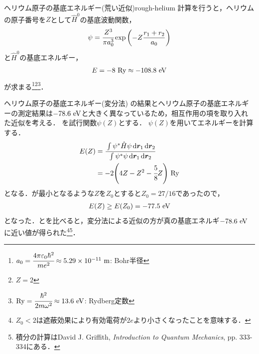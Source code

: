 \documentclass{report}
\begin{document}
  \begin{myex}{ヘリウム原子の基底エネルギー(荒い近似)}{rough-helium}
    計算を行うと，ヘリウムの原子番号を$Z$として$\hat{H}^0$の基底波動関数，
    \begin{align}
      \psi = \cfrac{Z^3}{\pi a_0^3}\exp\qty(-Z\frac{r_1 + r_2}{a_0})\label{helium}
    \end{align}
    と$\hat{H}^0$の基底エネルギー，
    \begin{align}
      E = -8\ \mathrm{Ry}\approx -108.8\ \mathrm{eV}\label{helium-rough-min}
    \end{align}
    が求まる\footnote{
      $a_0 = \cfrac{4\pi\epsilon_0\hbar^2}{me^2} \approx 5.29\times 10^{-11}\ \r{m}$: Bohr半径
    }\footnote{
      $Z = 2$
    }\footnote{
      $\mathrm{Ry} = \cfrac{\hbar^2}{2m\omega^2} \approx 13.6 \ \mathrm{eV}$: Rydberg定数
    }．
  \end{myex}
  \begin{myex}{ヘリウム原子の基底エネルギー(変分法)}{}
    の結果とヘリウム原子の基底エネルギーの測定結果は$-78.6\ \r{eV}$と大きく異なっているため，相互作用の項を取り入れた近似を考える．
    を試行関数$\psi(Z)$とする．
    $\psi(Z)$を用いてエネルギーを計算する．
    \begin{align}
      E(Z) &= \cfrac{\int\psi^{*}\hat{H}\psi \dd{\bm{r}_1}\dd{\bm{r}_2}}{\int\psi^{*}\psi \dd{\bm{r}_1}\dd{\bm{r}_2}} \\
      &= -2\qty(4Z - Z^2 - \cfrac{5}{8}Z)\ \r{Ry}\label{helium-energy-function} 
    \end{align}
    となる．が最小となるような$Z$を$Z_0$とすると$Z_0 = 27/16$であったので，
    \begin{align}
      E(Z) \geq E\qty(Z_0) = -77.5\ \r{eV}\label{helium-energy-varidation-min}
    \end{align}
    となった．とを比べると，変分法による近似の方が真の基底エネルギ$-78.6\ \r{eV}$に近い値が得られた\footnote{
      $Z_0 < 2$は遮蔽効果により有効電荷が$2e$より小さくなったことを意味する．
    }\footnote{
      積分の計算はDavid J. Griffith, \textit{Introduction to Quantum Mechanics}, pp. 333-334にある．
    }．
  \end{myex}
\end{document}
